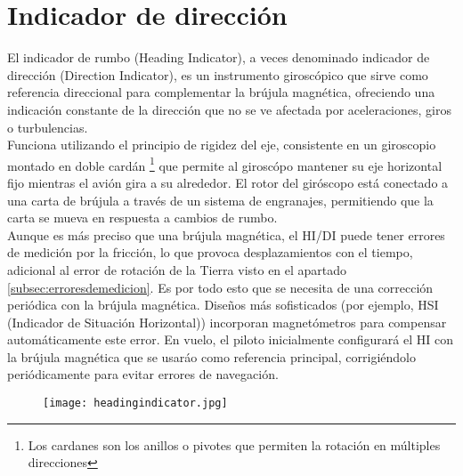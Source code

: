\section{Indicador de dirección}
El indicador de rumbo (Heading Indicator), a veces denominado indicador de dirección (Direction Indicator), es un instrumento giroscópico que sirve como referencia direccional para complementar la brújula magnética, ofreciendo una indicación constante de la dirección que no se ve afectada por aceleraciones, giros o turbulencias.\\

Funciona utilizando el principio de rigidez del eje, consistente en un giroscopio montado en doble cardán \footnote{Los cardanes son los anillos o pivotes que permiten la rotación en múltiples direcciones} que permite al giroscópo mantener su eje horizontal fijo mientras el avión gira a su alrededor. El rotor del giróscopo está conectado a una carta de brújula a través de un sistema de engranajes, permitiendo que la carta se mueva en respuesta a cambios de rumbo.\\

Aunque es más preciso que una brújula magnética, el HI/DI puede tener errores de medición por la fricción, lo que provoca desplazamientos con el tiempo, adicional al error de rotación de la Tierra visto en el apartado \ref{subsec:erroresdemedicion}. Es por todo esto que se necesita de una corrección periódica con la brújula magnética. Diseños más sofisticados (por ejemplo, HSI (Indicador de Situación Horizontal)) incorporan magnetómetros para compensar automáticamente este error. En vuelo, el piloto inicialmente configurará el HI con la brújula magnética que se usaráo como referencia principal, corrigiéndolo periódicamente para evitar errores de navegación.

\begin{figure}[H]
    \centering
    \begin{minipage}{0.65\textwidth} 
        \centering
        \texttt{[image: headingindicator.jpg]}
    \end{minipage}%
    \hfill
    \begin{minipage}{0.3 \textwidth} %
    \end{minipage}
\end{figure}


